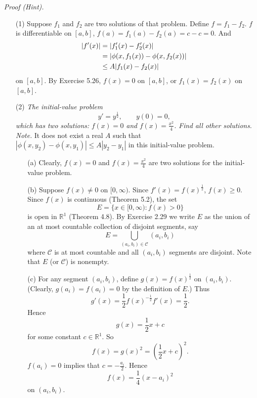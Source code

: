 \documentclass{article}
\begin{document}
\emph{Proof (Hint).}
\begin{enumerate}
\item[(1)]
Suppose $f_1$ and $f_2$ are two solutions of that problem.
Define $f = f_1 - f_2$.
$f$ is differentiable on $[a,b]$, $f(a) = f_1(a) - f_2(a) = c - c = 0$.
And
\begin{align*}
  |f'(x)|
  &= |f_1'(x) - f_2'(x)| \\
  &= \abs{ \phi(x,f_1(x)) - \phi(x,f_2(x)) } \\
  &\leq A | f_1(x) - f_2(x) |
\end{align*}
on $[a,b]$.
By Exercise 5.26, $f(x) = 0$ on $[a,b]$, or $f_1(x) = f_2(x)$ on $[a,b]$.

\item[(2)]
\emph{The initial-value problem
\[
  y' = y^{\frac{1}{2}}, \qquad y(0) = 0,
\]
which has two solutions: $f(x) = 0$ and $f(x) = \frac{x^2}{4}$.
Find all other solutions.} \\

  \emph{Note.}
  It does not exist a real $A$ such that $|\phi(x,y_2) - \phi(x,y_1)| \leq A|y_2 - y_1|$
  in this initial-value problem.

  \begin{enumerate}
  \item[(a)]
  Clearly, $f(x) = 0$ and $f(x) = \frac{x^2}{4}$ are two solutions for the initial-value problem.

  \item[(b)]
  Suppose $f(x) \neq 0$ on $[0,\infty)$.
  Since $f'(x) = f(x)^{\frac{1}{2}}$, $f(x) \geq 0$.
  Since $f(x)$ is continuous (Theorem 5.2), the set
  \[
    E = \{ x \in [0, \infty) : f(x) > 0 \}
  \]
  is open in $\mathbb{R}^1$ (Theorem 4.8).
  By Exercise 2.29
  we write $E$ as the union of an at most countable collection of disjoint segments,
  say
  \[
    E = \bigcup_{(a_i,b_i) \in \mathscr{C}} (a_i,b_i)
  \]
  where $\mathscr{C}$ is at most countable and all $(a_i,b_i)$ segments are disjoint.
  Note that $E$ (or $\mathscr{C}$) is nonempty.

  \item[(c)]
  For any segment $(a_i,b_i)$,
  define $g(x) = f(x)^{\frac{1}{2}}$ on $(a_i,b_i)$.
  (Clearly, $g(a_i) = f(a_i) = 0$ by the definition of $E$.)
  Thus
  \[
    g'(x) = \frac{1}{2} f(x)^{-\frac{1}{2}} f'(x) = \frac{1}{2}.
  \]
  Hence
  \[
    g(x) = \frac{1}{2} x + c
  \]
  for some constant $c \in \mathbb{R}^1$.
  So
  \[
    f(x) = g(x)^2 = \left( \frac{1}{2} x + c \right)^2.
  \]
  $f(a_i) = 0$ implies that $c = -\frac{a_i}{2}$.
  Hence
  \[
    f(x) = \frac{1}{4}(x - a_i)^2
  \]
  on $(a_i,b_i)$.


\end{enumerate}
\end{enumerate}
\end{document}
